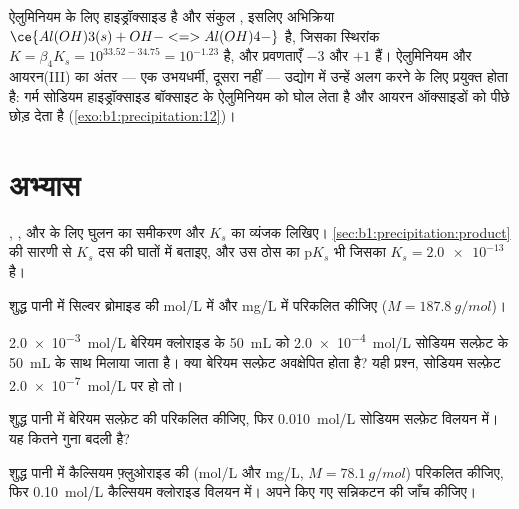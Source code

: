 ऐलुमिनियम के लिए हाइड्रॉक्साइड  है और संकुल ,
इसलिए अभिक्रिया $\ce{Al(OH)3(s) + OH- <=> Al(OH)4-}$ है, जिसका स्थिरांक
$K = \beta_4 K_s = 10^{33.52 - 34.75} = 10^{-1.23}$ है, और प्रवणताएँ $-3$ और $+1$ हैं। ऐलुमिनियम और
आयरन(III) का अंतर --- एक उभयधर्मी, दूसरा नहीं --- उद्योग में उन्हें
अलग करने के लिए प्रयुक्त होता है: गर्म सोडियम हाइड्रॉक्साइड बॉक्साइट के
ऐलुमिनियम को घोल लेता है और आयरन ऑक्साइडों को पीछे छोड़ देता है
(\cref{exo:b1:precipitation:12})।

\section{अभ्यास}

\begin{exercise}[$\star$]\label{exo:b1:precipitation:1}
, ,  और  के लिए घुलन का समीकरण और
$K_s$ का व्यंजक लिखिए। \cref{sec:b1:precipitation:product} की सारणी से $K_s$ दस की घातों में
बताइए, और उस ठोस का $\mathrm{p}K_s$ भी जिसका $K_s = \num{2.0e-13}$ है।
\end{exercise}

\begin{exercise}[$\star$]\label{exo:b1:precipitation:2}
शुद्ध पानी में सिल्वर ब्रोमाइड की  \unit{mol/L} में
और \unit{mg/L} में परिकलित कीजिए ($M = \qty{187.8}{g/mol}$)।
\end{exercise}

\begin{exercise}[$\star$]\label{exo:b1:precipitation:3}
\qty{2.0e-3}{mol/L} बेरियम क्लोराइड के \qty{50}{mL} को
\qty{2.0e-4}{mol/L} सोडियम सल्फ़ेट के \qty{50}{mL} के साथ मिलाया जाता है। क्या बेरियम
सल्फ़ेट अवक्षेपित होता है? यही प्रश्न, सोडियम सल्फ़ेट
\qty{2.0e-7}{mol/L} पर हो तो।
\end{exercise}

\begin{exercise}[$\star$]\label{exo:b1:precipitation:4}
शुद्ध पानी में बेरियम सल्फ़ेट की  परिकलित कीजिए, फिर
\qty{0.010}{mol/L} सोडियम सल्फ़ेट विलयन में। यह कितने गुना
बदली है?
\end{exercise}

\begin{exercise}[$\star\star$]\label{exo:b1:precipitation:5}
शुद्ध पानी में कैल्सियम फ़्लुओराइड की  (\unit{mol/L} और
\unit{mg/L}, $M = \qty{78.1}{g/mol}$) परिकलित कीजिए, फिर \qty{0.10}{mol/L}
कैल्सियम क्लोराइड विलयन में। अपने किए गए सन्निकटन की जाँच कीजिए।
\end{exercise}

